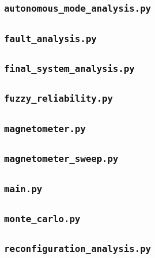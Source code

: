 \documentclass[11pt,a4paper]{article}
\begin{document}
\subsection{\texttt{autonomous\_mode\_analysis.py}}


\subsection{\texttt{fault\_analysis.py}}


\subsection{\texttt{final\_system\_analysis.py}}


\subsection{\texttt{fuzzy\_reliability.py}}


\subsection{\texttt{magnetometer.py}}


\subsection{\texttt{magnetometer\_sweep.py}}


\subsection{\texttt{main.py}}


\subsection{\texttt{monte\_carlo.py}}


\subsection{\texttt{reconfiguration\_analysis.py}}

\end{document}
